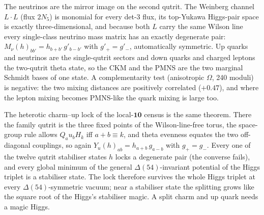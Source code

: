 The neutrinos are the mirror image on the second qutrit. The Weinberg channel $L\cdot L$ (flux $2N_5$) is monomial for every det-3 flux, its top-Yukawa Higgs-pair space is exactly three-dimensional, and because both $L$ carry the same Wilson line every single-class neutrino mass matrix has an exactly degenerate pair: $M_\nu(h)_{bb'}=h_{b+b'}\,g'_{b-b'}$ with $g'_+=g'_-$, automatically symmetric. Up quarks and neutrinos are the single-qutrit sectors and down quarks and charged leptons the two-qutrit theta state, so the CKM and the PMNS are the two marginal Schmidt bases of one state. A complementarity test (anisotropic $\Omega$, 240 moduli) is negative: the two mixing distances are positively correlated ($+0.47$), and where the lepton mixing becomes PMNS-like the quark mixing is large too. 

The heterotic charm--up lock of the local-$\mathbf{10}$ census is the same theorem. There the family qutrit is the three fixed points of the Wilson-line-free torus, the space-group rule allows $Q_au_bH_k$ iff $a+b\equiv k$, and theta evenness equates the two off-diagonal couplings, so again $Y_u(h)_{ab}=h_{a+b}\,g_{a-b}$ with $g_+=g_-$. Every one of the twelve qutrit stabiliser states $h$ locks a degenerate pair (the converse fails), and every global minimum of the general $\Delta(54)$-invariant potential of the Higgs triplet is a stabiliser state. The lock therefore survives the whole Higgs triplet at every $\Delta(54)$-symmetric vacuum; near a stabiliser state the splitting grows like the square root of the Higgs's stabiliser magic. A split charm and up quark needs a magic Higgs. 

